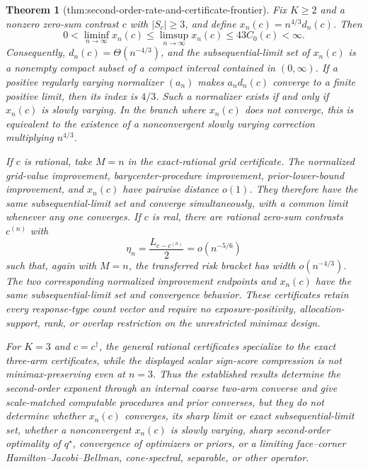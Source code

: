 \documentclass{article}
\newtheorem{theorem}{Theorem}
\begin{document}
\begin{theorem}[thm:second-order-rate-and-certificate-frontier]\label{thm:second-order-rate-and-certificate-frontier}
Fix \(K\geq2\) and a nonzero zero-sum contrast \(c\) with \(|S_c|\geq3\), and define \(x_n(c)=n^{4/3}d_n(c)\). Then
\[
 0<\liminf_{n\to\infty}x_n(c)
 \leq\limsup_{n\to\infty}x_n(c)
 \leq43C_0(c)<\infty.
\]
Consequently, \(d_n(c)=\Theta(n^{-4/3})\), and the subsequential-limit set of \(x_n(c)\) is a nonempty compact subset of a compact interval contained in \((0,\infty)\). If a positive regularly varying normalizer \((a_n)\) makes \(a_nd_n(c)\) converge to a finite positive limit, then its index is \(4/3\). Such a normalizer exists if and only if \(x_n(c)\) is slowly varying. In the branch where \(x_n(c)\) does not converge, this is equivalent to the existence of a nonconvergent slowly varying correction multiplying \(n^{4/3}\).

If \(c\) is rational, take \(M=n\) in the exact-rational grid certificate. The normalized grid-value improvement, barycenter-procedure improvement, prior-lower-bound improvement, and \(x_n(c)\) have pairwise distance \(o(1)\). They therefore have the same subsequential-limit set and converge simultaneously, with a common limit whenever any one converges. If \(c\) is real, there are rational zero-sum contrasts \(c^{(n)}\) with
\[
 \eta_n=\frac{L_{c-c^{(n)}}}{2}=o(n^{-5/6})
\]
such that, again with \(M=n\), the transferred risk bracket has width \(o(n^{-4/3})\). The two corresponding normalized improvement endpoints and \(x_n(c)\) have the same subsequential-limit set and convergence behavior. These certificates retain every response-type count vector and require no exposure-positivity, allocation-support, rank, or overlap restriction on the unrestricted minimax design.

For \(K=3\) and \(c=c^\dagger\), the general rational certificates specialize to the exact three-arm certificates, while the displayed scalar sign-score compression is not minimax-preserving even at \(n=3\). Thus the established results determine the second-order exponent through an internal coarse two-arm converse and give scale-matched computable procedures and prior converses, but they do not determine whether \(x_n(c)\) converges, its sharp limit or exact subsequential-limit set, whether a nonconvergent \(x_n(c)\) is slowly varying, sharp second-order optimality of \(q^\star\), convergence of optimizers or priors, or a limiting face--corner Hamilton--Jacobi--Bellman, cone-spectral, separable, or other operator.
\end{theorem}
\end{document}
